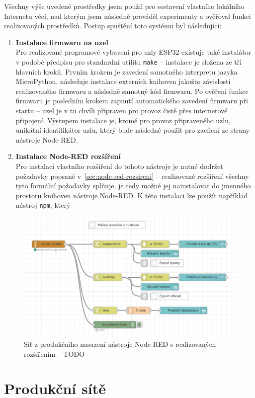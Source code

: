 Všechny výše uvedené prostředky jsem použil pro sestavení vlastního lokálního Internetu věcí, nad kterým jsem následně
prováděl experimenty a ověřoval funkci realizovaných prostředků.
Postup spuštění toto systému byl následující:
\begin{enumerate}
    \item \textbf{Instalace firmwaru na uzel} \\
    Pro realizované programové vybavení pro uzly ESP32 existuje také instalátor v podobě předpisu pro standardní
    utilitu \texttt{make} -- instalace je složena ze tří hlavních kroků.
    Prvním krokem je zavedení samotného interpretu jazyka MicroPython, následuje instalace externích knihoven jakožto
    závislostí realizovaného firmwaru a následně samotný kód firmwaru.
    Po ověření funkce firmwaru je posledním krokem zapnutí automatického zavedení firmwaru při startu -- uzel je v tu
    chvíli připraven pro provoz čistě přes internetové připojení.
    Výstupem instalace je, kromě pro provoz připraveného uzlu, unikátní identifikátor uzlu, který bude následně použit
    pro zacílení ze strany nástroje Node-RED.

    \item \textbf{Instalace Node-RED rozšíření} \\
    Pro instalaci vlastního rozšíření do tohoto nástroje je nutné dodržet požadavky popsané
    v~\ref{sec:node-red-rozsireni} -- realizované rozšíření všechny tyto formální požadavky splňuje, je tedy možné jej
    nainstalovat do jmenného prostoru knihoven nástroje Node-RED.
    K této instalaci lze použít například nástroj \texttt{npm}, který


\end{enumerate}


\begin{figure}
    \centering
    \includegraphics[width=\textwidth]{figures/fis-flow-1.png}
    \caption{Síť z produkčního nasazení nástroje Node-RED s realizovaných rozšířením -- TODO}
\end{figure}

\section{Produkční sítě}\label{sec:site-nástroje-node-red}
